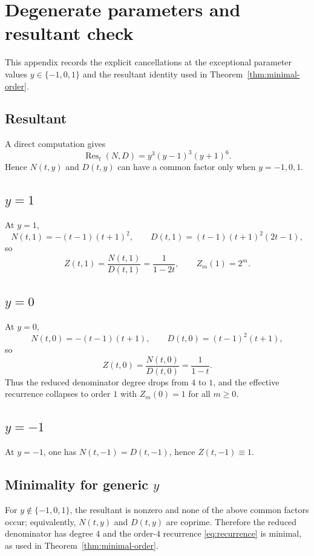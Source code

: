\section{Degenerate parameters and resultant check}\label{app:degeneracies}

This appendix records the explicit cancellations at the exceptional parameter values \(y\in\{-1,0,1\}\) and the resultant identity used in Theorem~\ref{thm:minimal-order}.

\subsection{Resultant}

A direct computation gives
\[
\operatorname{Res}_t(N,D)=y^3(y-1)^3(y+1)^6.
\]
Hence \(N(t,y)\) and \(D(t,y)\) can have a common factor only when \(y=-1,0,1\).

\subsection{\texorpdfstring{\(y=1\)}{y=1}}

At \(y=1\),
\[
N(t,1)=-(t-1)(t+1)^2,
\qquad
D(t,1)=(t-1)(t+1)^2(2t-1),
\]
so
\[
Z(t,1)=\frac{N(t,1)}{D(t,1)}=\frac{1}{1-2t},
\qquad
Z_m(1)=2^m.
\]

\subsection{\texorpdfstring{\(y=0\)}{y=0}}

At \(y=0\),
\[
N(t,0)=-(t-1)(t+1),
\qquad
D(t,0)=(t-1)^2(t+1),
\]
so
\[
Z(t,0)=\frac{N(t,0)}{D(t,0)}=\frac{1}{1-t}.
\]
Thus the reduced denominator degree drops from \(4\) to \(1\), and the effective recurrence collapses to order \(1\) with \(Z_m(0)=1\) for all \(m\ge 0\).

\subsection{\texorpdfstring{\(y=-1\)}{y=-1}}

At \(y=-1\), one has \(N(t,-1)=D(t,-1)\), hence \(Z(t,-1)\equiv 1\).

\subsection{Minimality for generic \texorpdfstring{\(y\)}{y}}

For \(y\notin\{-1,0,1\}\), the resultant is nonzero and none of the above common factors occur; equivalently, \(N(t,y)\) and \(D(t,y)\) are coprime.
Therefore the reduced denominator has degree \(4\) and the order-\(4\) recurrence \eqref{eq:recurrence} is minimal, as used in Theorem~\ref{thm:minimal-order}.

